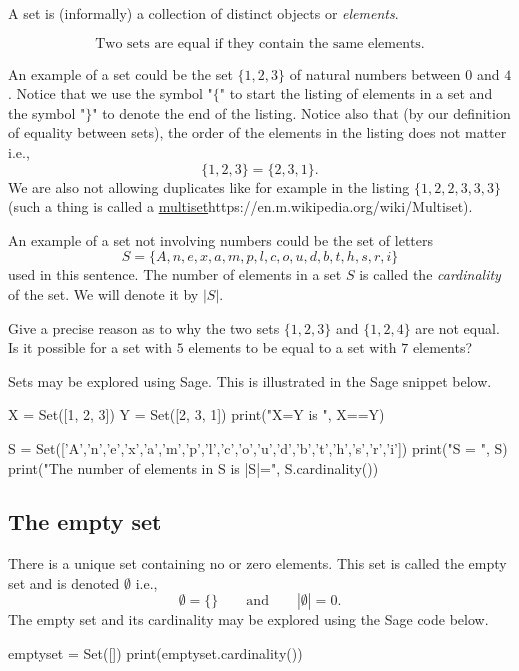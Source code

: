 \documentclass{article}
\begin{document}
A set is (informally) a collection of distinct objects or \emph{elements}. 

\begin{equation*}[emph]
  \text{Two sets are equal if they contain the same elements.}
\end{equation*}

An example of a set could be 
the set $\{1,2,3\}$ of natural numbers between $0$ and $4$. Notice that we use the symbol
"$\{$" to start the listing of elements in a set and the symbol "$\}$" to denote the end of the listing.
Notice also that (by our definition of equality between sets), the order of the elements in the listing does not matter i.e.,
$$
\{1, 2, 3\} = \{2, 3, 1\}.
$$
We are also not allowing duplicates like for
example in the listing $\{1, 2, 2, 3, 3, 3\}$ (such a thing is called a \url{multiset}{https://en.m.wikipedia.org/wiki/Multiset}).

An example of a set not involving numbers could be the set of letters 
$$
S=\{A, n, e, x, a, m, p, l, c, o, u, d, b, t, h, s, r, i\}
$$ 
used in this sentence. The number of elements in a set $S$ is called the \emph{cardinality} of the set.
We will denote it by $|S|$.

\beginshex
Give a precise reason as to why the two sets $\{1, 2, 3\}$ and $\{1, 2, 4\}$ are not equal.
Is it possible for a set with $5$ elements to be equal to a set with $7$ elements?
\endshex



Sets may be explored using Sage. This is illustrated in the Sage snippet below.

\begin{code}
X = Set([1, 2, 3])
Y = Set([2, 3, 1])
print("X=Y is ", X==Y)

S = Set(['A','n','e','x','a','m','p','l','c','o','u','d','b','t','h','s','r','i'])
print("S = ", S) 
print("The number of elements in S is |S|=", S.cardinality())
\end{code}


\subsection{The empty set}

There is a unique set containing no or zero elements. This set is called the empty set and
is denoted $\emptyset$ i.e.,
$$
\emptyset = \{\}\qquad\text{and}\qquad |\emptyset| = 0.
$$
The empty set and its cardinality may be explored using the Sage code below.

\begin{code}
emptyset = Set([])
print(emptyset.cardinality())
\end{code}
\end{document}
